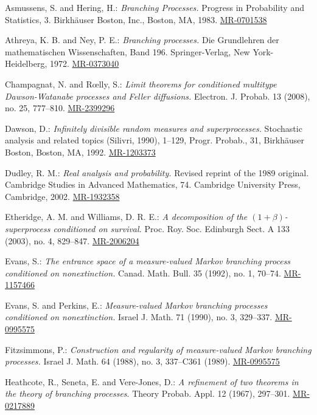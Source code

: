 \documentclass[12pt,a4paper]{amsart}
\numberwithin{equation}{section}
\theoremstyle{plain}
\theoremstyle{definition}
\theoremstyle{remark}
\def\MR#1{\href{http://www.ams.org/mathscinet-getitem?mr=#1}{MR-#1}}
\begin{document}
\begin{thebibliography}{99}

	Asmussens, S. and Hering, H.:
	\emph{Branching Processes.}
	Progress in Probability and Statistics, 3. Birkh\"auser Boston, Inc., Boston, MA, 1983.
	\MR{0701538}

	Athreya, K. B. and Ney, P. E.:
	\emph{Branching processes.}
	Die Grundlehren der mathematischen Wissenschaften, Band 196. Springer-Verlag, New York-Heidelberg, 1972.
	\MR{0373040}
	
	Champagnat, N. and R{\oe}lly, S.:
	\emph{Limit theorems for conditioned multitype Dawson-Watanabe processes and Feller diffusions.}
	Electron. J. Probab. 13 (2008), no. 25, 777--810.
	\MR{2399296}

	Dawson, D.:
	\emph{Infinitely divisible random measures and superprocesses.}
	Stochastic analysis and related topics (Silivri, 1990), 1--129, Progr. Probab., 31, Birkh\"auser Boston, Boston, MA, 1992.
	\MR{1203373}
	
	Dudley, R. M.:
	\emph{Real analysis and probability.}
	Revised reprint of the 1989 original. Cambridge Studies in Advanced Mathematics, 74. Cambridge University Press, Cambridge, 2002.
	\MR{1932358}
	
	Etheridge, A. M. and Williams, D. R. E.:
	\emph{A decomposition of the $(1+\beta)$-superprocess conditioned on survival.}
	Proc. Roy. Soc. Edinburgh Sect. A 133 (2003), no. 4, 829--847.
	\MR{2006204}

	
	Evans, S.:
	\emph{The entrance space of a measure-valued Markov branching process conditioned on nonextinction.}
	Canad. Math. Bull. 35 (1992), no. 1, 70--74.
	\MR{1157466} 

	
	Evans, S. and Perkins, E.:
	\emph{Measure-valued Markov branching processes conditioned on nonextinction.}
	Israel J. Math. 71 (1990), no. 3,
	329--337.
	\MR{0995575}
	
	Fitzsimmons, P.:
	\emph{Construction and regularity of measure-valued Markov branching processes.}
	Israel J. Math. 64 (1988), no. 3, 337--C361 (1989).
	\MR{0995575} 


	Heathcote, R.,  Seneta, E.  and Vere-Jones, D.:
	\emph{A refinement of two theorems in the theory of branching processes}.
	Theory Probab. Appl. 12 (1967), 297--301.
	\MR{0217889}


\end{thebibliography}
\end{document}
